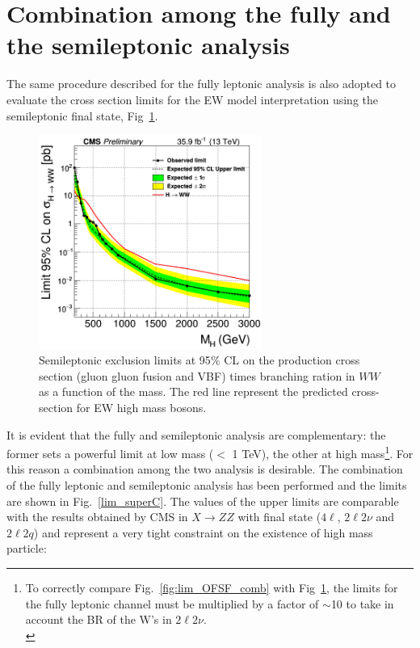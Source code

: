 \section{Combination among the fully and the semileptonic analysis}
The same procedure described for the fully leptonic analysis is also adopted to evaluate the cross section limits 
for the EW model interpretation using the semileptonic final state, Fig~\ref{limit_observed_lnuqq_VBF0_log-1}.
\begin{figure}[htb]
\centering
\includegraphics[width=0.65\textwidth]{../Cap6/lnuqq}
\caption{Semileptonic exclusion limits at 95$\%$ CL  on the production cross section (gluon gluon fusion and VBF) times branching ration in $WW$ as a function of the mass.  The red line represent the predicted cross-section for EW high mass bosons.}
\label{limit_observed_lnuqq_VBF0_log-1}
\end{figure}
It is evident that the fully and semileptonic analysis are complementary: 
the former sets a powerful limit at low mass ($<$ 1 TeV), the other at  high mass\footnote{To correctly compare Fig.~\ref{fig:lim_OFSF_comb} with  Fig~\ref{limit_observed_lnuqq_VBF0_log-1}, the limits for the 
fully leptonic channel must be multiplied by a factor of $\sim$10 to take in account the BR of the W's in $ 2\ell 2\nu$.\\
}. For this reason a combination among the two analysis is desirable.
\newline
The  combination of the fully leptonic and semileptonic analysis has been performed and the limits are shown in Fig.~\ref{lim_superC}. 
The values of the upper limits are comparable with the results obtained by CMS in $X \to ZZ$ with final state ($4\ell$, $2\ell 2\nu$ and $2\ell 2q$) \cite{Sirunyan:2018qlb} and represent a very tight constraint on the existence of  high mass particle: 
